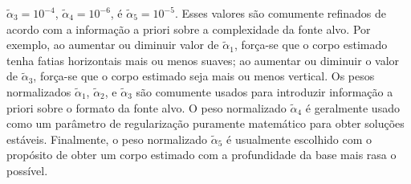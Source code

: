 $\tilde{\alpha}_{3} = 10^{-4}$, $\tilde{\alpha}_{4} = 10^{-6}$, é 
$\tilde{\alpha}_{5} = 10^{-5}$. 
Esses valores são comumente refinados de acordo com a informação a priori sobre a complexidade da fonte alvo. Por exemplo, ao aumentar ou diminuir valor de $\tilde{\alpha}_{1}$, força-se que o corpo estimado tenha fatias horizontais mais ou menos suaves; ao aumentar ou diminuir o valor de $\tilde{\alpha}_{3}$, força-se que o corpo estimado seja mais ou menos vertical. Os pesos normalizados
$\tilde{\alpha}_{1}$, $\tilde{\alpha}_{2}$, e $\tilde{\alpha}_{3}$ são comumente usados para introduzir informação a priori sobre o formato da fonte alvo. O peso normalizado $\tilde{\alpha}_{4}$ é geralmente usado como um parâmetro de regularização puramente matemático para obter soluções estáveis. Finalmente, o peso normalizado $\tilde{\alpha}_{5}$ é usualmente escolhido com o propósito de obter um corpo estimado com a profundidade da base mais rasa o possível.